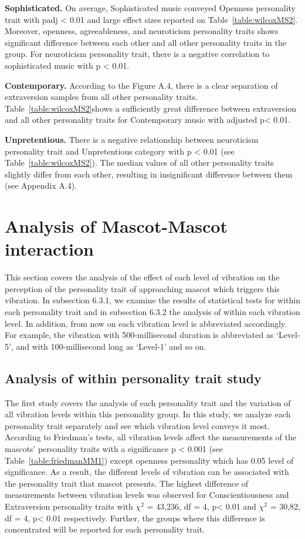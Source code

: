 \par \textbf{Sophisticated.} On average, Sophisticated music conveyed Openness personality trait with padj < 0.01
and large effect sizes reported on Table~\ref{table:wilcoxMS2}. Moreover, openness, agreeableness, and neuroticism
personality traits shows significant difference between each other and all other personality traits in the group.
For neuroticism personality trait, there is a negative correlation to sophisticated music with p < 0.01.
\par \textbf{Contemporary.} According to the Figure A.4, there is a clear separation of extraversion samples from all
other personality traits. Table~\ref{table:wilcoxMS2}shows a sufficiently great difference between extraversion and all
other personality traits for Contemporary music with adjusted p< 0.01.
\par \textbf{Unpretentious.} There is a negative relationship between neuroticism personality trait and Unpretentious
category with p < 0.01 (see Table~\ref{table:wilcoxMS2}). The median values of all other personality traits slightly
differ from each other, resulting in insignificant difference between them (see Appendix A.4).

\section{Analysis of Mascot-Mascot interaction}
\label{M-M}
This section covers the analysis of the effect of each level of vibration on the perception of the personality trait
of approaching mascot which triggers this vibration. In subsection 6.3.1, we examine the results of statistical tests
for within each personality trait and in subsection 6.3.2 the analysis of within each vibration level. In addition,
from now on each vibration level is abbreviated accordingly. For example, the vibration with 500-millisecond duration
is abbreviated as ‘Level-5’, and with 100-millisecond long as ‘Level-1’ and so on.

\subsection{Analysis of within personality trait study}
\label{Study1(M-M)}
The first study covers the analysis of each personality trait and the variation of all vibration levels within this
personality group. In this study, we analyze each personality trait separately and see which vibration level conveys
it most. According to Friedman’s tests, all vibration levels affect the measurements of the mascots’ personality traits
with a significance p < 0.001 (see Table~\ref{table:friedmanMM1}) except openness personality which has 0.05 level of
significance. As a result, the different levels of vibration can be associated with the personality trait that mascot
presents. The highest difference of measurements between vibration levels was observed for Conscientiousness and
Extraversion personality traits with $\chi^2$ = 43,236, df = 4, p< 0.01 and $\chi^2$ = 30,82, df = 4, p< 0.01 respectively.
Further, the groups where this difference is concentrated will be reported for each personality trait.

